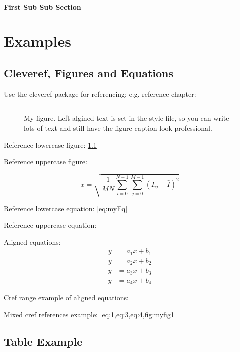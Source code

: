 \documentclass[12pt]{book}
\begin{document}
\subsubsection{First Sub Sub Section}

\chapter{Examples}\label{chap:one}
\section{Cleveref, Figures and Equations}

Use the cleveref package for referencing; e.g. reference chapter: 

\begin{figure}[h!]
  \centering
  \rule{20pt}{20pt}
  \caption{My figure. Left algined text is set in the style file, so you can write lots of text and still have the figure caption look professional.}
  \label{fig:myfig1}
\end{figure}

\noindent Reference lowercase figure: \cref{fig:myfig1}

\noindent Reference uppercase figure: 

\begin{equation} 
  x = \sqrt{\frac{1}{M N}\sum_{i=0}^{N-1}\sum_{j=0}^{M - 1}(I_{ij} - \bar{I})^2} \label{eq:myEq}
\end{equation}

\noindent Reference lowercase equation: \cref{eq:myEq}

\noindent Reference uppercase equation: 

\noindent Aligned equations:
\begin{align}
  y&=a_1x+b_1\label{eq:1}\\
  y&=a_2x+b_2\label{eq:2}\\
  y&=a_3x+b_3\label{eq:3}\\
  y&=a_4x+b_4\label{eq:4}
\end{align}

\noindent Cref range example of aligned equations: 
 
\noindent Mixed cref references example: \cref{eq:1,eq:3,eq:4,fig:myfig1}

\newpage
\section{Table Example}
\end{document}
